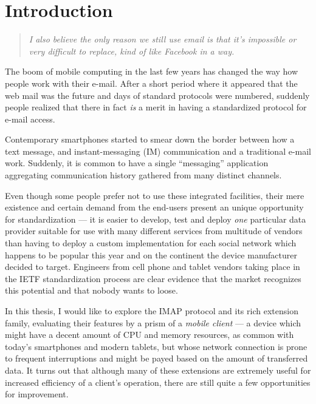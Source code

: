 \documentclass[trojita]{subfiles}
\begin{document}
\chapter{Introduction}

\begin{quote}
  \itshape I also believe the only reason we still use email is that it’s impossible or very difficult to replace, kind
  of like Facebook in a way. 
\end{quote}

The boom of mobile computing in the last few years has changed the way how people work with their e-mail.  After a short
period where it appeared that the web mail was the future and days of standard protocols were numbered, suddenly people
realized that there in fact {\em is} a merit in having a standardized protocol for e-mail access.

Contemporary smartphones started to smear down the border between how a text message, and instant-messaging (IM)
communication and a traditional e-mail work.  Suddenly, it is common to have a single ``messaging'' application
aggregating communication history gathered from many distinct channels.

Even though some people prefer not to use these integrated facilities, their mere existence and certain demand from the
end-users present an unique opportunity for standardization --- it is easier to develop, test and deploy {\em one}
particular data provider suitable for use with many different services from multitude of vendors than having to deploy a
custom implementation for each social network which happens to be popular this year and on the continent the device
manufacturer decided to target.  Engineers from cell phone and tablet vendors taking place in the IETF standardization
process are clear evidence that the market recognizes this potential and that nobody wants to loose.

In this thesis, I would like to explore the IMAP protocol \cite{rfc3501} and its rich extension family, evaluating their
features by a prism of a {\em mobile client} --- a device which might have a decent amount of CPU and memory resources,
as common with today's smartphones and modern tablets, but whose network connection is prone to frequent interruptions
and might be payed based on the amount of transferred data.  It turns out that although many of these extensions are
extremely useful for increased efficiency of a client's operation, there are still quite a few opportunities for
improvement.
\end{document}
